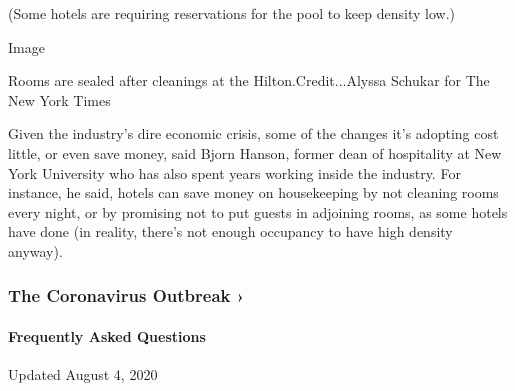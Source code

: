 (Some hotels are requiring reservations for the pool to keep density
low.)

Image

Rooms are sealed after cleanings at the Hilton.Credit...Alyssa Schukar
for The New York Times

Given the industry's dire economic crisis, some of the changes it's
adopting cost little, or even save money, said Bjorn Hanson, former dean
of hospitality at New York University who has also spent years working
inside the industry. For instance, he said, hotels can save money on
housekeeping by not cleaning rooms every night, or by promising not to
put guests in adjoining rooms, as some hotels have done (in reality,
there's not enough occupancy to have high density anyway).

\href{https://www.nytimes.com/news-event/coronavirus?action=click\&pgtype=Article\&state=default\&region=MAIN_CONTENT_3\&context=storylines_faq}{}

\hypertarget{the-coronavirus-outbreak-}{%
\subsubsection{The Coronavirus Outbreak
›}\label{the-coronavirus-outbreak-}}

\hypertarget{frequently-asked-questions}{%
\paragraph{Frequently Asked
Questions}\label{frequently-asked-questions}}

Updated August 4, 2020

